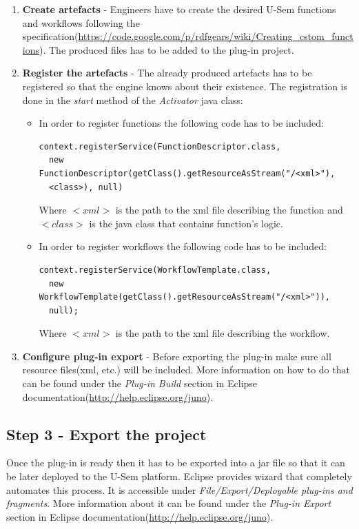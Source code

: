 \begin{enumerate}
	\item \textbf{Create artefacts} - Engineers have to create the desired U-Sem functions and workflows following the specification(\url{https://code.google.com/p/rdfgears/wiki/Creating_cstom_functions}). The produced files has to be added to the plug-in project.
	\item \textbf{Register the artefacts} - The already produced artefacts has to be registered so that the engine knows about their existence. The registration is done in the \textit{start} method of the \textit{Activator} java class:
	\begin{itemize}
	
		\item In order to register functions the following code has to be included:
		
\begin{lstlisting}
context.registerService(FunctionDescriptor.class, 
  new FunctionDescriptor(getClass().getResourceAsStream("/<xml>"), 
  <class>), null)
\end{lstlisting}

		Where \textit{$<xml>$} is the path to the xml file describing the function and \textit{$<class>$} is the java class that contains function's logic.
		
		\item In order to register workflows the following code has to be included: 
\begin{lstlisting}
context.registerService(WorkflowTemplate.class,
  new WorkflowTemplate(getClass().getResourceAsStream("/<xml>")),
  null);
\end{lstlisting}

		Where \textit{$<xml>$} is the path to the xml file describing the workflow.
		
	\end{itemize}
	\item \textbf{Configure plug-in export} -  Before exporting the plug-in make sure all resource files(xml, etc.) will be included. More information on how to do that can be found under the \textit{Plug-in Build} section in Eclipse documentation(\url{http://help.eclipse.org/juno}).
	
	
\end{enumerate}

\subsection{Step 3 - Export the project}
Once the plug-in is ready then it has to be exported into a jar file so that it can be later deployed to the U-Sem platform. Eclipse provides wizard that completely automates this process. It is accessible under \textit{File/Export/Deployable plug-ins and fragments}. More information about it can be found under the \textit{Plug-in Export} section in Eclipse documentation(\url{http://help.eclipse.org/juno}).

